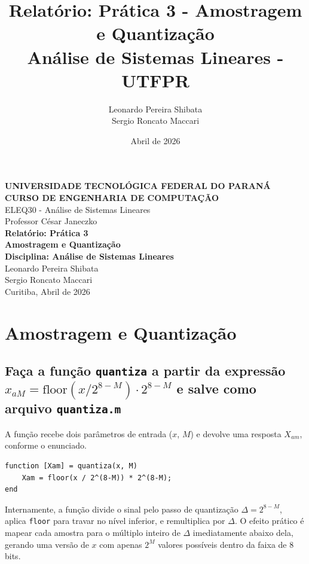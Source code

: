 \documentclass[12pt]{article}
\title{Relatório: Prática 3 - Amostragem e Quantização \\ \large Análise de Sistemas Lineares - UTFPR}
\author{Leonardo Pereira Shibata \\ Sergio Roncato Maccari}
\date{Abril de 2026}
\begin{document}
\begin{titlepage}
    \begin{center}
        \Large \textbf{UNIVERSIDADE TECNOLÓGICA FEDERAL DO PARANÁ} \\
        \Large \textbf{CURSO DE ENGENHARIA DE COMPUTAÇÃO} \\
        \large ELEQ30 - Análise de Sistemas Lineares \\
        \large Professor César Janeczko \\
        \vspace{5cm}
        \huge \textbf{Relatório: Prática 3} \\
        \large \textbf{Amostragem e Quantização} \\
        \vspace{1.5cm}
        \Large \textbf{Disciplina: Análise de Sistemas Lineares} \\
        \vspace{4cm}
        \Large Leonardo Pereira Shibata \\
        \Large Sergio Roncato Maccari \\
        \vfill
        \Large Curitiba, Abril de 2026
    \end{center}
\end{titlepage}

\section{Amostragem e Quantização}

\subsection{Faça a função \texttt{quantiza} a partir da expressão $x_{aM} = \mathrm{floor}(x/2^{8-M})\cdot 2^{8-M}$ e salve como arquivo \texttt{quantiza.m}}

A função recebe dois parâmetros de entrada ($x$, $M$) e devolve uma resposta $X_{am}$, conforme o enunciado.

\begin{lstlisting}
function [Xam] = quantiza(x, M)
    Xam = floor(x / 2^(8-M)) * 2^(8-M);
end
\end{lstlisting}

Internamente, a função divide o sinal pelo passo de quantização $\Delta = 2^{8-M}$, aplica \texttt{floor} para travar no nível inferior, e remultiplica por $\Delta$. O efeito prático é mapear cada amostra para o múltiplo inteiro de $\Delta$ imediatamente abaixo dela, gerando uma versão de $x$ com apenas $2^M$ valores possíveis dentro da faixa de 8 bits.
\end{document}
